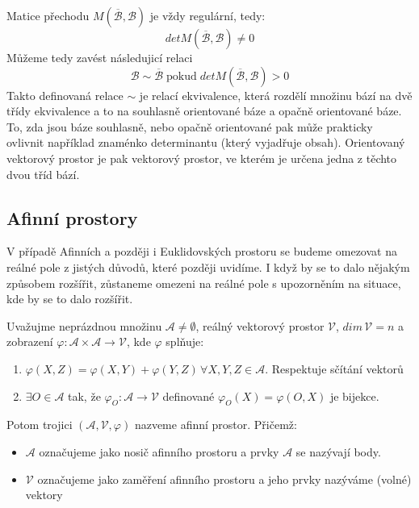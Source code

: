 Matice přechodu $M(\overline{\mathcal{B}}, \mathcal{B})$ je vždy regulární,
tedy:
$$det M(\overline{\mathcal{B}}, \mathcal{B}) \neq 0$$
Můžeme tedy zavést následujicí relaci
$$\mathcal{B} \sim \overline{\mathcal{B}}\; \text{pokud}\; det M(\overline{\mathcal{B}}, \mathcal{B}) > 0$$
Takto definovaná relace $\sim$ je relací ekvivalence, která rozdělí množinu bází na dvě třídy
ekvivalence a to na souhlasně orientované báze a opačně orientované báze. To, zda jsou báze souhlasně, nebo
opačně orientované pak může prakticky ovlivnit například znaménko determinantu (který vyjadřuje obsah).
Orientovaný vektorový prostor je pak vektorový prostor, ve kterém je určena jedna z těchto dvou tříd bází.


\subsection{Afinní prostory}
V případě Afinních a později i Euklidovských prostoru se budeme omezovat na reálné pole
z jistých důvodů, které později uvidíme. I když by se to dalo nějakým způsobem rozšířit,
zůstaneme omezeni na reálné pole s upozorněním na situace, kde by se to dalo rozšířit.

\begin{definition}
    Uvažujme neprázdnou množinu $\mathcal{A} \neq \emptyset$,
    reálný vektorový prostor $\mathcal{V}$, $dim\,\mathcal{V} = n$ a zobrazení $\varphi: \mathcal{A}
    \times \mathcal{A} \rightarrow \mathcal{V}$, kde $\varphi$ splňuje:
    \begin{enumerate}[]
        \item $\varphi(X, Z) = \varphi(X, Y) + \varphi(Y, Z)\,\forall X, Y, Z \in \mathcal{A}$.
        \hfill Respektuje sčítání vektorů
        \item $\exists O \in \mathcal{A}$ tak, že
        $\varphi_{O}: \mathcal{A} \rightarrow \mathcal{V}$ definované $\varphi_O(X) = \varphi(O, X)$
        je bijekce. %
    \end{enumerate}

    Potom trojici $(\mathcal{A}, \mathcal{V}, \varphi)$ nazveme afinní prostor.
    Přičemž:
    \begin{itemize}
        \item $\mathcal{A}$ označujeme jako nosič afinního prostoru a prvky $\mathcal{A}$ se
        nazývají body.
        \item $\mathcal{V}$ označujeme jako zaměření afinního prostoru a jeho prvky nazýváme
            (volné) vektory
    \end{itemize}
\end{definition}

